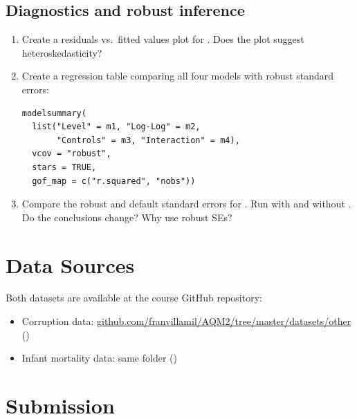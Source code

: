 \subsection{Diagnostics and robust inference}

\begin{enumerate}[label=\alph*)]
  \item Create a residuals vs.\ fitted values plot for . Does the plot suggest heteroskedasticity?
  \item Create a regression table comparing all four models with robust standard errors:
  \begin{lstlisting}
modelsummary(
  list("Level" = m1, "Log-Log" = m2,
       "Controls" = m3, "Interaction" = m4),
  vcov = "robust",
  stars = TRUE,
  gof_map = c("r.squared", "nobs"))
  \end{lstlisting}
  \item Compare the robust and default standard errors for . Run  with and without . Do the conclusions change? Why use robust SEs?
\end{enumerate}

\vspace{15pt}

\section{Data Sources}

Both datasets are available at the course GitHub repository:
\begin{itemize}
  \item Corruption data: \href{https://github.com/franvillamil/AQM2/tree/master/datasets/other}{github.com/franvillamil/AQM2/tree/master/datasets/other}\\()
  \item Infant mortality data: same folder ()
\end{itemize}

\vspace{15pt}

\section{Submission}

